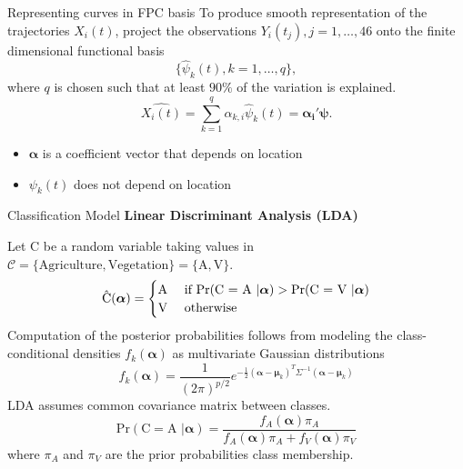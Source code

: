 \documentclass{beamer}
\newcommand{\balpha}{\boldsymbol\alpha}
\begin{document}

\begin{frame}[t]{Representing curves in FPC basis}
	To produce smooth representation of the trajectories $X_i(t)$, project the observations $Y_i(t_j), j = 1, \dots, 46$ onto the finite dimensional functional basis
	\[
	\{\hat{\psi}_k(t), k = 1, \dots, q\},
	\]
where $q$ is chosen such that at least $90\%$ of the variation is explained.
	\begin{equation*}
		\widehat{X_i(t)} = \sum_{k=1}^q\alpha_{k,i} \hat{\psi}_k(t) = \boldsymbol{\alpha_i'}\boldsymbol{\psi}.
		\label{phen:coef}
	\end{equation*}
	\begin{itemize}
		\item $\balpha$ is a coefficient vector that depends on location
		\item $\psi_k(t)$ does not depend on location
	\end{itemize}

\end{frame}

\begin{frame}[t]{Classification Model}
	\textbf{Linear Discriminant Analysis (LDA)} %

	Let C be a random variable taking values in $\mathcal{C} = \{ \text{Agriculture}, \text{Vegetation}\} = \{\text{A}, \text{V}\}$.
	\begin{equation*}
		\hat{\text{C}}(\boldsymbol{\alpha}) =
		\begin{cases}
				\text{A} \hfill & \text{ if } \text{Pr}(\text{C = A }| \boldsymbol{\alpha})> \text{Pr}(\text{C = V }| \boldsymbol{\alpha})\\
				\text{V} \hfill & \text{ otherwise}
		\end{cases}
	\end{equation*}
	Computation of the posterior probabilities follows from modeling the class-conditional densities $f_k(\boldsymbol\alpha)$ as multivariate Gaussian distributions
	\begin{equation*}
		f_k(\boldsymbol\alpha) = \frac{1}{(2\pi)^{p/2}}e^{-\frac{1}{2}(\boldsymbol\alpha - \boldsymbol\mu_k)^T\Sigma^{-1}(\boldsymbol\alpha - \boldsymbol\mu_k)}
	\end{equation*}
	LDA assumes common covariance matrix between classes.
	\begin{equation*}
		\text{Pr}(\text{C} = \text{A } | \boldsymbol\alpha) = \frac{f_{A}(\boldsymbol\alpha)\pi_{A}}{f_{A}(\boldsymbol\alpha)\pi_{A}+f_{V}(\boldsymbol\alpha)\pi_{V}}
	\end{equation*}
	where $\pi_{A}$ and $\pi_{V}$ are the prior probabilities class membership.
\end{frame}
\end{document}

